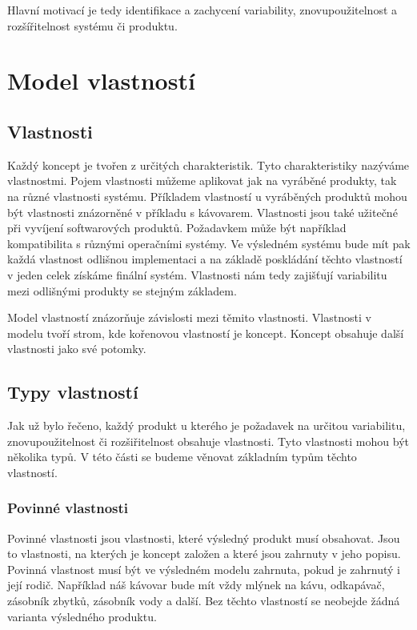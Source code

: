 Hlavní motivací je tedy identifikace a zachycení variability, znovupoužitelnost a rozšířitelnost systému či produktu.

\section{Model vlastností}

\subsection{Vlastnosti}

Každý koncept je tvořen z určitých charakteristik. Tyto charakteristiky nazýváme vlastnostmi. Pojem vlastnosti můžeme aplikovat jak na vyráběné produkty, tak na různé vlastnosti systému. Příkladem vlastností u vyráběných produktů mohou být vlastnosti znázorněné v příkladu s kávovarem. Vlastnosti jsou také užitečné při vyvíjení softwarových produktů. Požadavkem může být například kompatibilita s různými operačními systémy. Ve výsledném systému bude mít pak každá vlastnost odlišnou implementaci a na základě poskládání těchto vlastností v jeden celek získáme finální systém. Vlastnosti nám tedy zajišťují variabilitu mezi odlišnými produkty se stejným základem.

Model vlastností znázorňuje závislosti mezi těmito vlastnosti. Vlastnosti v modelu tvoří strom, kde kořenovou vlastností je koncept. Koncept obsahuje další vlastnosti jako své potomky.

\subsection{Typy vlastností}

Jak už bylo řečeno, každý produkt u kterého je požadavek na určitou variabilitu, znovupoužitelnost či rozšiřitelnost obsahuje vlastnosti. Tyto vlastnosti mohou být několika typů. V této části se budeme věnovat základním typům těchto vlastností.

\subsubsection{Povinné vlastnosti}
Povinné vlastnosti jsou vlastnosti, které výsledný produkt musí obsahovat. Jsou to vlastnosti, na kterých je koncept založen a které jsou zahrnuty v jeho popisu. Povinná vlastnost musí být ve výsledném modelu zahrnuta, pokud je zahrnutý i její rodič. Například náš kávovar bude mít vždy mlýnek na kávu, odkapávač, zásobník zbytků, zásobník vody a další. Bez těchto vlastností se neobejde žádná varianta výsledného produktu. 

